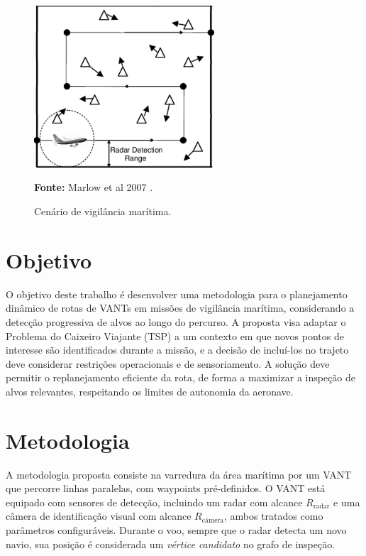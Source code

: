 \documentclass[12 pt]{article}
\begin{document}
\begin{figure}[H]
    \centering
    \includegraphics[width=0.6\textwidth]{fig/vant.png}
    \caption{Cenário de vigilância marítima.}

    \small
    \textbf{Fonte:} Marlow et al 2007 \cite{marlow_2007}.
 \end{figure}

\section{Objetivo}
O objetivo deste trabalho é desenvolver uma metodologia para o planejamento dinâmico de rotas de VANTs em missões de vigilância marítima, considerando a detecção progressiva de alvos ao longo do percurso. A proposta visa adaptar o Problema do Caixeiro Viajante (TSP) a um contexto em que novos pontos de interesse são identificados durante a missão, e a decisão de incluí-los no trajeto deve considerar restrições operacionais e de sensoriamento. A solução deve permitir o replanejamento eficiente da rota, de forma a maximizar a inspeção de alvos relevantes, respeitando os limites de autonomia da aeronave.

\section{Metodologia}
A metodologia proposta consiste na varredura da área marítima por um VANT que percorre linhas paralelas, com waypoints pré-definidos. O VANT está equipado com sensores de detecção, incluindo um radar com alcance \( R_{\text{radar}} \) e uma câmera de identificação visual com alcance \( R_{\text{câmera}} \), ambos tratados como parâmetros configuráveis. Durante o voo, sempre que o radar detecta um novo navio, sua posição é considerada um \textit{vértice candidato} no grafo de inspeção.
\end{document}
